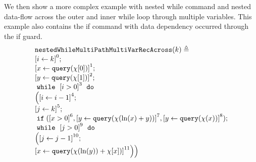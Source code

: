                                 \begin{example}
                                    We then show a more complex example with nested while command and nested data-flow across the outer and inner while loop through multiple variables.
                                    This example also contains the if command with data dependency occurred through the if guard.
                                    \[
                                    \begin{array}{l}
                                    \kw{nestedWhileMultiPathMultiVarRecAcross}(k) \triangleq \\
                                        \clabel{\assign{i}{k} }^{0} ; \\
                                        \clabel{ \assign{x}{\query(\chi[0])}}^{1} ; \\
                                        \clabel{ \assign{y}{\query(\chi[1])}}^{2} ; \\
                                            \ewhile ~ \clabel{i > 0}^{3} ~ \edo ~ \\
                                            \Big(
                                             \clabel{\assign{i}{i-1}}^{4} ;\\
                                             \clabel{\assign{j}{k}}^{5} ;\\
                                             \eif(\clabel{x > 0}^6, \clabel{\assign{y}{\query(\chi(\ln(x) + y))} }^{7},
                                             \clabel{\assign{y}{\query(\chi(x))} }^{8} )
                                              ; \\
                                             \ewhile ~ \clabel{j > 0}^{9} ~ \edo ~ \\
                                             \Big(
                                              \clabel{\assign{j}{j-1}}^{10};\\
                                              \clabel{\assign{x}{\query(\chi(\ln(y))+\chi[x])} }^{11}
                                              \Big) \Big)
                                        \end{array}
                                    \]
                                    \end{example}
